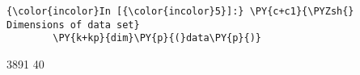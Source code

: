    \begin{Verbatim}[commandchars=\\\{\}]
{\color{incolor}In [{\color{incolor}5}]:} \PY{c+c1}{\PYZsh{} Dimensions of data set}
        \PY{k+kp}{dim}\PY{p}{(}data\PY{p}{)}
\end{Verbatim}



3891 \hspace{1pt} 40


